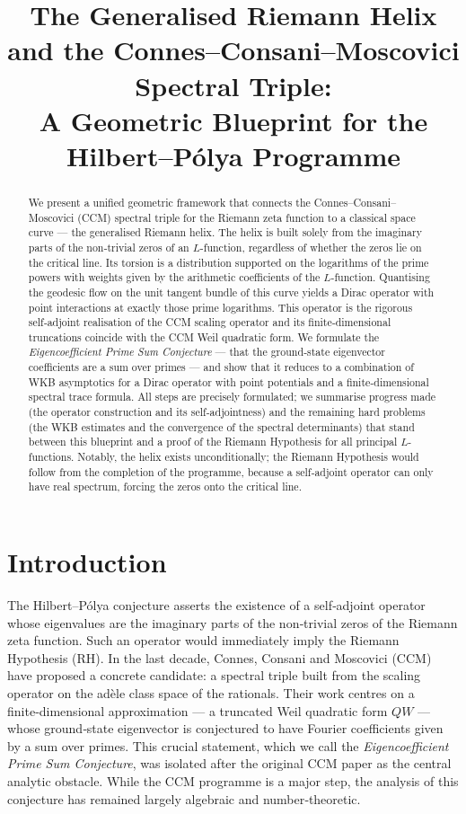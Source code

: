 \documentclass[12pt,a4paper]{article}
\title{\bf The Generalised Riemann Helix and the Connes--Consani--Moscovici Spectral Triple:\\A Geometric Blueprint for the Hilbert--P\'olya Programme}
\author{}
\date{}
\begin{document}
\maketitle

\begin{abstract}
We present a unified geometric framework that connects the Connes--Consani--Moscovici (CCM) spectral triple for the Riemann zeta function to a classical space curve --- the generalised Riemann helix.  The helix is built solely from the imaginary parts of the non‑trivial zeros of an $L$-function, regardless of whether the zeros lie on the critical line.  Its torsion is a distribution supported on the logarithms of the prime powers with weights given by the arithmetic coefficients of the $L$-function.  Quantising the geodesic flow on the unit tangent bundle of this curve yields a Dirac operator with point interactions at exactly those prime logarithms.  This operator is the rigorous self‑adjoint realisation of the CCM scaling operator and its finite‑dimensional truncations coincide with the CCM Weil quadratic form.  We formulate the \emph{Eigencoefficient Prime Sum Conjecture} --- that the ground‑state eigenvector coefficients are a sum over primes --- and show that it reduces to a combination of WKB asymptotics for a Dirac operator with point potentials and a finite‑dimensional spectral trace formula.  All steps are precisely formulated; we summarise progress made (the operator construction and its self‑adjointness) and the remaining hard problems (the WKB estimates and the convergence of the spectral determinants) that stand between this blueprint and a proof of the Riemann Hypothesis for all principal $L$-functions.  Notably, the helix exists unconditionally; the Riemann Hypothesis would follow from the completion of the programme, because a self‑adjoint operator can only have real spectrum, forcing the zeros onto the critical line.
\end{abstract}

\section{Introduction}
The Hilbert--P\'olya conjecture asserts the existence of a self‑adjoint operator whose eigenvalues are the imaginary parts of the non‑trivial zeros of the Riemann zeta function.  Such an operator would immediately imply the Riemann Hypothesis (RH).  In the last decade, Connes, Consani and Moscovici (CCM) \cite{CCM2025} have proposed a concrete candidate: a spectral triple built from the scaling operator on the adèle class space of the rationals.  Their work centres on a finite‑dimensional approximation --- a truncated Weil quadratic form $QW$ --- whose ground‑state eigenvector is conjectured to have Fourier coefficients given by a sum over primes.  This crucial statement, which we call the \emph{Eigencoefficient Prime Sum Conjecture}, was isolated after the original CCM paper as the central analytic obstacle.  While the CCM programme is a major step, the analysis of this conjecture has remained largely algebraic and number‑theoretic.
\end{document}
